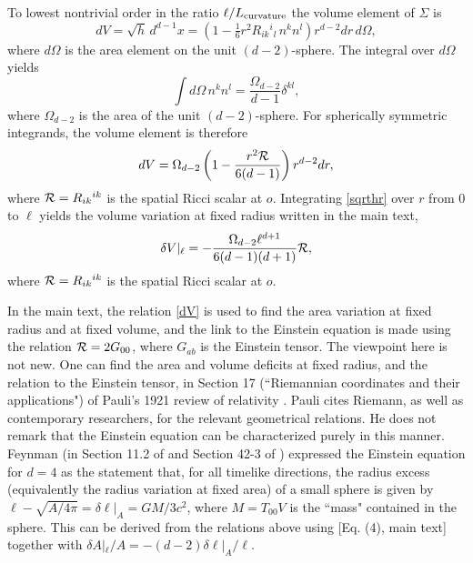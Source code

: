 \documentclass[aps,prd,twocolumn,showpacs,groupedaddress,nofootinbib,longbibliography]{revtex4-1}
\def\beq{\begin{equation}}
\def\eeq{\end{equation}}
\def\d{\delta}\def\D{\Delta}
\def\O{\Omega}
\begin{document}
To lowest nontrivial order in the ratio $\ell/L_{\rm curvature}$
the volume element of $\Sigma$  is 
%
\beq\label{sqrth}
dV =\sqrt{h}\, d^{d-1}x =(1 - \tfrac16 r^2 R_{ik}{}^{i}{}_l\, n^k n^l)r^{d-2}dr\, d\O,
\eeq
%
where $d\O$ is the area element on the unit $(d-2)$-sphere.  
The integral over $d\O$ yields
%
\beq\label{intnn}
\int d\O \,n^kn^l = \frac{\O_{d-2}}{d-1}\d^{kl},
\eeq
where 
$\O_{d-2}$ is the area of the unit $(d-2)$-sphere. For spherically
symmetric integrands, the volume element is therefore 
%
\beq\label{sqrthr}
dV =\O_{d-2}\left(1 - \frac{r^2{\cal R}}{6(d-1)}\right)r^{d-2}dr,
\eeq
%
where ${\cal R}=R_{ik}{}^{ik}$ is the spatial Ricci scalar  at $o$.
Integrating \eqref{sqrthr} over $r$ from 0 to $\ell$ yields 
the volume variation at fixed radius written in the main text, 
%
\beq\label{dV}
\d V|_{\ell} = -\frac{\O_{d-2}\ell^{d+1}}{6(d-1)(d+1)}{\cal R},
\eeq
%
where ${\cal R}=R_{ik}{}^{ik}$ is the spatial Ricci scalar  at $o$.

In the main text, the relation \eqref{dV} is used to find the area variation
at fixed radius and at fixed volume, and the link to the Einstein
equation is made using the relation ${\cal R}=2G_{00}$, where 
$G_{ab}$ is the Einstein tensor.
The viewpoint here is not new. One can find 
the area and volume deficits at fixed radius, and the relation to the Einstein tensor,  
in Section 17 (``Riemannian coordinates and their applications") of Pauli's 1921 review of relativity \cite{PauliEncyc}.
 Pauli cites Riemann, as well as contemporary researchers, for the relevant geometrical relations.  He does not remark that the Einstein equation can be characterized purely in this manner. 
Feynman (in Section 11.2 of \cite{FeynmanGrav} and Section 42-3 of \cite{Feynman}) 
 expressed the Einstein equation for $d=4$ as the statement that, for all timelike directions,
the radius excess (equivalently the radius variation at fixed area) of a small sphere is given by  
$\ell - \sqrt{A/4\pi}=\d \ell|_A = GM/3c^2$, where $M=T_{00}V$ is the ``mass" contained in the sphere.
This can be derived from the relations above using %
[Eq. (4), main text]
together with 
$\d A|_\ell/A = -(d-2)\d \ell|_A/\ell$. 
\end{document}
